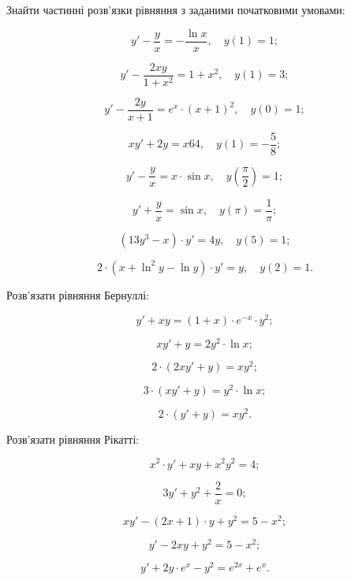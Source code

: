 Знайти частинні розв’язки рівняння з заданими початковими умовами:
\begin{problem}
	\[y'-\frac yx=-\frac{\ln x}x, \quad y(1)=1;\]
\end{problem}
\begin{problem}
	\[y'-\frac{2xy}{1+x^2}=1+x^2, \quad y(1)=3;\]
\end{problem}
\begin{problem}
	\[y'-\frac{2y}{x+1}=e^{x}\cdot(x+1)^2, \quad y(0)=1;\]
\end{problem}
\begin{problem}
	\[xy'+2y=x64,\quad y(1)=-\frac58;\]	
\end{problem}
\begin{problem}
	\[ y' - \frac yx  = x \cdot \sin x, \quad y\left(\frac\pi2\right)=1;\]
\end{problem}
\begin{problem}
	\[y'+\frac yx=\sin x, \quad y(\pi)=\frac1\pi;\]
\end{problem}
\begin{problem}
	\[(13y^3-x)\cdot y'=4y, \quad y(5)=1;\]
\end{problem}
\begin{problem}
	\[2\cdot(x+\ln^2y-\ln y)\cdot y'= y, \quad y(2)=1.\]
\end{problem}

Розв’язати рівняння Бернуллі:
\begin{multicols}{2}
\begin{problem}
	\[y'+xy=(1+x)\cdot e^{-x}\cdot y^2;\]
\end{problem}
\begin{problem}
	\[xy'+y=2y^2\cdot \ln x;\]
\end{problem}
\begin{problem}
	\[2\cdot(2xy'+y)=xy^2;\]
\end{problem}
\begin{problem}
	\[3\cdot(xy'+y)=y^2\cdot \ln x;\]
\end{problem}
\begin{problem}
	\[2\cdot(y'+y)=xy^2.\]
\end{problem}
\end{multicols}

Розв’язати рівняння Рікатті:
\begin{multicols}{2}
\begin{problem}
	\[x^2\cdot y' + xy +x^2y^2=4;\]
\end{problem}
\begin{problem}
	\[3y'+y^2+\frac2x=0;\]
\end{problem}
\begin{problem}
	\[xy'-(2x+1)\cdot y+y^2=5-x^2;\]
\end{problem}
\begin{problem}
	\[y'-2xy+y^2=5-x^2;\]
\end{problem}
\begin{problem}
	\[y'+2y \cdot e^x - y^2 = e^{2x} + e^x.\]
\end{problem}
\end{multicols}